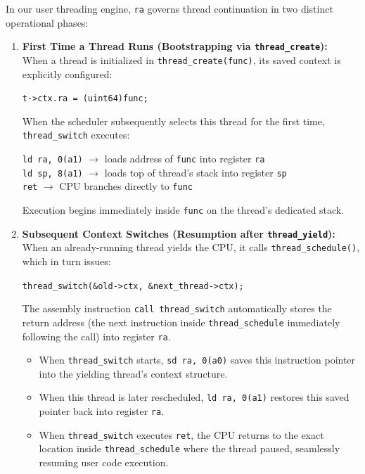 \documentclass{labreport}
\begin{document}
In our user threading engine, \texttt{ra} governs thread continuation in two distinct operational phases:

\begin{enumerate}[leftmargin=*]
    \item \textbf{First Time a Thread Runs (Bootstrapping via \texttt{thread\_create}):}\\
    When a thread is initialized in \texttt{thread\_create(func)}, its saved context is explicitly configured:
    \begin{center}
        \texttt{t->ctx.ra = (uint64)func;}
    \end{center}
    When the scheduler subsequently selects this thread for the first time, \texttt{thread\_switch} executes:
    \begin{center}
        \texttt{ld ra, 0(a1)} $\longrightarrow$ loads address of \texttt{func} into register \texttt{ra}\\
        \texttt{ld sp, 8(a1)} $\longrightarrow$ loads top of thread's stack into register \texttt{sp}\\
        \texttt{ret} $\longrightarrow$ CPU branches directly to \texttt{func}
    \end{center}
    Execution begins immediately inside \texttt{func} on the thread's dedicated stack.

    \item \textbf{Subsequent Context Switches (Resumption after \texttt{thread\_yield}):}\\
    When an already-running thread yields the CPU, it calls \texttt{thread\_schedule()}, which in turn issues:
    \begin{center}
        \texttt{thread\_switch(\&old->ctx, \&next\_thread->ctx);}
    \end{center}
    The assembly instruction \texttt{call thread\_switch} automatically stores the return address (the next instruction inside \texttt{thread\_schedule} immediately following the call) into register \texttt{ra}.
    \begin{itemize}[noitemsep]
        \item When \texttt{thread\_switch} starts, \texttt{sd ra, 0(a0)} saves this instruction pointer into the yielding thread's context structure.
        \item When this thread is later rescheduled, \texttt{ld ra, 0(a1)} restores this saved pointer back into register \texttt{ra}.
        \item When \texttt{thread\_switch} executes \texttt{ret}, the CPU returns to the exact location inside \texttt{thread\_schedule} where the thread paused, seamlessly resuming user code execution.
    \end{itemize}
\end{enumerate}
\end{document}
